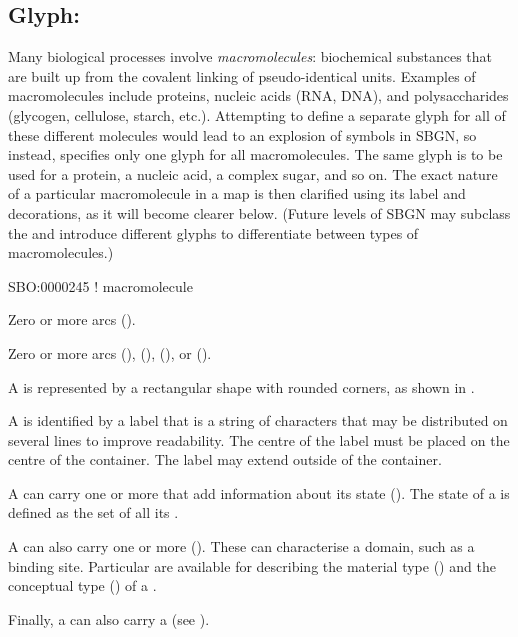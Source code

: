 \subsection{Glyph: }
\label{sec:macromolecule}

Many biological processes involve \emph{macromolecules}: biochemical substances that are built up from the covalent linking of pseudo-identical units.
Examples of macromolecules include proteins, nucleic acids (RNA, DNA), and polysaccharides (glycogen, cellulose, starch, etc.).
Attempting to define a separate glyph for all of these different molecules would lead to an explosion of symbols in SBGN, so instead, \SBGNPDLone specifies only one glyph for all macromolecules.
The same glyph is to be used for a protein, a nucleic acid, a complex sugar, and so on.
The exact nature of a particular macromolecule in a map is then clarified using its label and decorations, as it will become clearer below.
% 
(Future levels of SBGN may subclass the  and introduce different glyphs to differentiate between types of macromolecules.)

\begin{glyphDescription}

\glyphSboTerm
SBO:0000245 ! macromolecule


\glyphIncoming
Zero or more  arcs ().



\glyphOutgoing
Zero or more  arcs (),  (),  (), or  ().


\glyphContainer
A  is represented by a rectangular shape with rounded corners, as shown in .

\glyphLabel
A  is identified by a label  that is a string of characters that may be distributed on several lines to improve readability.
The centre of the label must be placed on the centre of the container.
The label may extend outside of the container.

\glyphAux
A  can carry one or more  that add information about its state ().
The state of a  is defined as the set of all its .

A  can also carry one or more  ().
These can characterise a domain, such as a binding site.
Particular  are available for describing the material type () and the conceptual type () of a .

Finally, a  can also carry a  (see ).

\end{glyphDescription}

